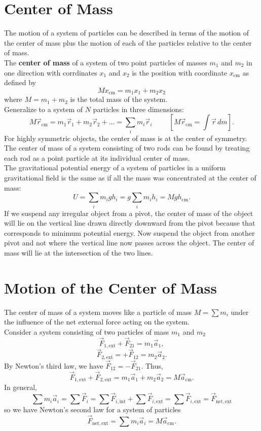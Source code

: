 \documentclass[11pt,letterpaper]{report}
\begin{document}
\section{Center of Mass}
The motion of a system of particles can be described in terms of the motion of the center of mass plus the motion of each of the particles relative to the center of mass.
\\The \textbf{center of mass} of a system of two point particles of masses $m_1$ and $m_2$ in one direction with corrdinates $x_1$ and $x_2$ is the position with coordinate $x_\mathrm{cm}$ as defined by $$M x_\mathrm{cm} = m_1 x_1 + m_2 x_2$$ where $M = m_1 + m_2$ is the total mass of the system.
\\Generalize to a system of $N$ particles in three dimensions: $$M \vec{r}_\mathrm{cm} = m_1 \vec{r}_1 + m_2 \vec{r}_2 + \dots = \sum_i m_i \vec{r}_i \hspace{1cm} \left[M \vec{r}_\mathrm{cm} = \int{\vec{r}\,dm}\right].$$
For highly symmetric objects, the center of mass is at the center of symmetry. The center of mass of a system consisting of two rods can be found by treating each rod as a point particle at its individual center of mass.
\\The gravitational potential energy of a system of particles in a uniform gravitational field is the same as if all the mass was concentrated at the center of mass: $$U = \sum_i m_i gh_i = g \sum_i m_i h_i = Mgh_\mathrm{cm}.$$
If we suspend any irregular object from a pivot, the center of mass of the object will lie on the vertical line drawn directly downward from the pivot because that corresponds to minimum potential energy. Now suspend the object from another pivot and not where the vertical line now passes across the object. The center of mass will lie at the intersection of the two lines.

\section{Motion of the Center of Mass}
The center of mass of a system moves like a particle of mass $M = \sum{m_i}$ under the influence of the net external force acting on the system.
\\Consider a system consisting of two particles of mass $m_1$ and $m_2$ $$\vec{F}_{1\mathrm{, ext}} + \vec{F}_{21} = m_1 \vec{a}_1,$$ $$\vec{F}_{2\mathrm{, ext}} = +\vec{F}_{12} = m_2 \vec{a}_2.$$
By Newton's third law, we have $\vec{F}_{12} = -\vec{F}_{21}$. Thus, $$\vec{F}_{1\mathrm{, ext}} + \vec{F}_{2\mathrm{, ext}} = m_1 \vec{a}_1 +m_2 \vec{a}_2 = M \vec{a}_\mathrm{cm}.$$
In general, $$\sum m_i \vec{a}_i = \sum \vec{F}_i = \sum \vec{F}_{i\mathrm{, int}} + \sum \vec{F}_{i\mathrm{, ext}} = \sum \vec{F}_{i\mathrm{, ext}} = \vec{F}_\mathrm{net, ext}$$ so we have Newton's second law for a system of particles $$\vec{F}_\mathrm{net, ext} = \sum m_i \vec{a}_i = M \vec{a}_\mathrm{cm}.$$
\end{document}
